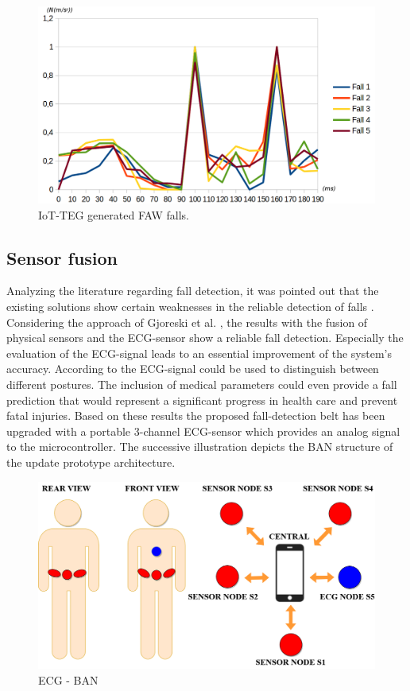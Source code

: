 \documentclass[review]{elsarticle}
\begin{document}
\begin{figure}[!ht]
	\centering
	\includegraphics[scale=0.25]{Images/IoTTEGFAWGeneratedEvents}
	\caption[IoT-TEG generated FAW falls]{IoT-TEG generated FAW falls.}
	\label{fig:IoTTEGFAWGeneratedEvents}
\end{figure}

\subsection{Sensor fusion}
\label{subsec:sensorfusion}	
Analyzing the literature regarding fall detection, it was pointed out that the existing solutions show certain weaknesses in the reliable detection of falls \cite{Igual2013, Li2009, Luder2009, Pannurat2014, jamsa2014fall}. Considering the approach of Gjoreski et al. \cite{Gjoreski2014}, the results with the fusion of physical sensors and the ECG-sensor show a reliable fall detection. Especially the evaluation of the ECG-signal leads to an essential improvement of the system's accuracy.  According to \cite{Gjoreski2014} the ECG-signal could be used to distinguish between different postures. The inclusion of medical parameters could even provide a fall prediction that would represent a significant progress in health care and prevent fatal injuries. Based on these results the proposed fall-detection belt  has been upgraded with a portable 3-channel ECG-sensor which provides an analog signal to the microcontroller. The successive illustration depicts the BAN structure of the update prototype architecture.
\begin{figure}[!ht]
	\centering
	\includegraphics[scale=0.30]{Images/ECG-BAN.png}
	\caption[ECG - BAN]{ECG - BAN}
	\label{fig:ECGBAN}
\end{figure}
\end{document}
